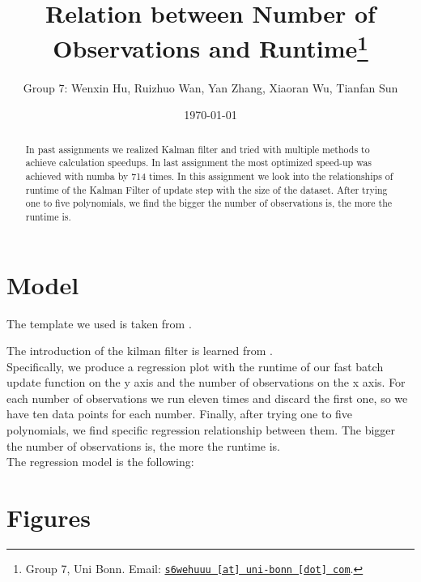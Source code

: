 \documentclass[11pt, a4paper, leqno]{article}
\begin{document}
\title{Relation between Number of Observations and Runtime\thanks{Group 7, Uni Bonn. Email: \href{mailto:s6wehuuu@uni-bonn.com}{\nolinkurl{s6wehuuu [at] uni-bonn [dot] com}}.}}

\author{Group 7: Wenxin Hu, Ruizhuo Wan, Yan Zhang, Xiaoran Wu, Tianfan Sun}

\date{
\today
}

\maketitle


\begin{abstract}

     In past assignments we realized Kalman filter and tried with multiple methods to achieve calculation speedups. In last assignment the most optimized speed-up was achieved with numba by 714 times. In this assignment we look into the relationships of runtime of the Kalman Filter of update step with the size of the dataset. After trying one to five polynomials, we find the bigger the number of observations is, the more the runtime is.
   

\end{abstract}
\clearpage

\section{Model} %
\label{sec:Model}

The template we used is taken from \citet{GaudeckerEconProjectTemplates}.

The introduction of the kilman filter is learned from \citet{Gabler18}. \\



Specifically, we produce a regression plot with the runtime of our fast batch update function on the y axis and the number of observations on the x axis. For each number of observations we run eleven times and discard the first one, so we have ten data points for each number. Finally, after trying one to five polynomials, we find specific regression relationship between them. The bigger the number of observations is, the more the runtime is.\\

   

The regression model is the following:


\clearpage


\section{Figures} %
\label{sec:Figures}
\end{document}

